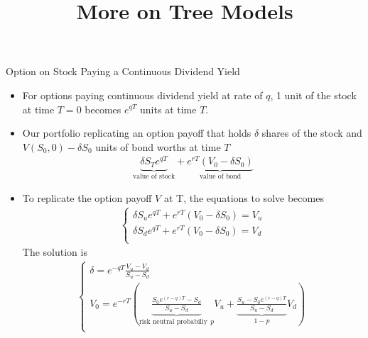 
\usepackage{todonotes}
\usepackage{graphicx}
\usepackage{amssymb}
\title[More on Tree Models]{\LARGE More on Tree Models}
\subject{More on Tree Models}


\begin{frame}
\titlepage
\end{frame}

\stretchon

\begin{frame}[fragile]{Option on Stock Paying a Continuous Dividend Yield}
    \begin{itemize}
\item For options paying continuous dividend yield at rate of $q$, 1 unit of the stock at time $T = 0$ becomes $e^{qT}$ units at time $T$.
\item Our portfolio replicating an option payoff that holds $\delta$ shares of the stock and $V(S_0, 0) - \delta S_0$ units of bond
worths  at time $T$
\begin{align*}
\underbrace{\delta S_T e^{qT}}_{\text{value of stock}} + \underbrace{e^{rT} (V_0 - \delta S_0)}_{\text{value of bond}}
\end{align*}
\end{itemize}
\end{frame}

\begin{frame}[fragile]
    \begin{itemize}
\item To replicate the option payoff $V$ at T, the equations to solve becomes
\begin{align} \begin{cases}
\delta S_u e^{qT} + e^{rT}(V_0 - \delta S_0) = V_u \\
\delta S_d e^{qT} + e^{rT}(V_0 - \delta S_0) = V_d \\
\end{cases}
\end{align}
The solution is
\begin{align} \begin{cases}
\delta = e^{-qT}\frac{V_u - V_d} {S_u - S_d} \\
V_0 = e^{-rT} \left( \underbrace{\frac{S_0e^{(r-q)T} - S_d}{S_u - S_d}}_{\text{risk neutral probabiliy}~~p} V_u + \underbrace{\frac{S_u-S_0e^{(r-q)T}}{S_u - S_d}}_{1 - p} V_d  \right)\\
\end{cases}
\end{align}
\end{itemize}
\end{frame}

